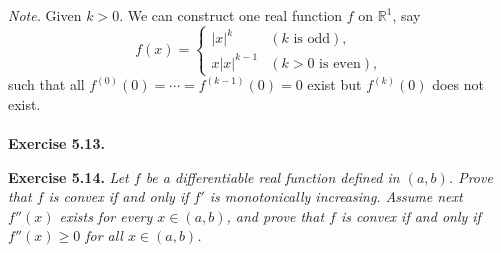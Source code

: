 \documentclass{article}
\begin{document}
\emph{Note.}
Given $k > 0$.
We can construct one real function $f$ on $\mathbb{R}^1$, say
  \begin{equation*}
    f(x) =
    \begin{cases}
      |x|^k      & (\text{$k$ is odd}), \\
      x|x|^{k-1} & (\text{$k > 0$ is even}),
    \end{cases}
  \end{equation*}
such that
all $f^{(0)}(0) = \cdots = f^{(k-1)}(0) = 0$ exist but $f^{(k)}(0)$ does not exist.
\\\\






\textbf{Exercise 5.13.}






\textbf{Exercise 5.14.}
\emph{Let $f$ be a differentiable real function defined in $(a,b)$.
Prove that $f$ is convex if and only if $f'$ is monotonically increasing.
Assume next $f''(x)$ exists for every $x \in (a,b)$,
and prove that $f$ is convex if and only if $f''(x) \geq 0$ for all $x \in (a,b)$.} \\
\end{document}
